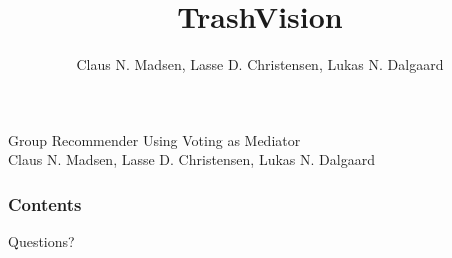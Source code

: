 \documentclass[10pt, hyperref={bookmarks=false}, show notes]{beamer}
\date
\begin{document}

\title[Group Recommendation Using Voting as Mediator]{TrashVision}
\author[\insertframenumber /\inserttotalframenumber]{Claus N. Madsen, Lasse D. Christensen, Lukas N. Dalgaard}

\begin{frame}
\Large Group Recommender Using Voting as Mediator\\
\small Claus N. Madsen, Lasse D. Christensen, Lukas N. Dalgaard\\
\end{frame}

\begin{frame}
  \frametitle{Contents}
  \tableofcontents
\end{frame}







\begin{frame}
\centering
\huge Questions?
\end{frame}

\section*{}
\end{document}
